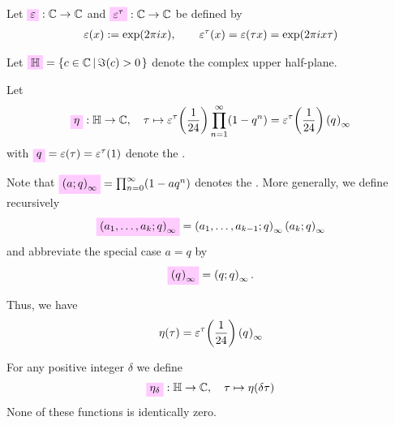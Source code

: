 \documentclass{article}
\begin{document}
\begin{Definition}\label{def:epsilon}
  Let $\defineNotation[epsilon]{\unityPowerSymbol}: \setC \to \setC$
  and $\defineNotation[epsilon-tau]{\unityPowerSymbol^\tau}: \setC \to \setC$
  be defined by
  \begin{gather*}
    \varepsilon\!\left(x\right) := \exp(2\pi i x),
    \qquad
    \varepsilon^\tau\!\left(x\right)=\varepsilon\!\left(\tau x\right) = \exp(2\pi i x \tau)
  \end{gather*}
\end{Definition}

Let $\defineNotation[H]{\setH}=\SetDef{c\in \setC}{\Im(c)>0}$ denote
the complex upper half-plane.

Let
\begin{gather}\label{eq:eta-expansion}
  \defineNotation[eta]{\eta}: \setH \to \setC, \quad
  \tau \mapsto \unityPowerTau{\frac{1}{24}} \prod_{n=1}^{\infty}(1-q^n)
  =
  \unityPowerTau{\frac{1}{24}} \eulerFunction{}
\end{gather}
with $\defineNotation[q]{q} = \unityPower{\tau} = \unityPowerTau{1}$
denote the .

Note that
$\defineNotation[a-q]{\qPochhammer{a}{q}}=\prod_{n=0}^{\infty}(1-aq^n)$
denotes the .
More generally, we define recursively
\begin{gather}
  \defineNotation[a-k-q]{\qPochhammer{a_1,\ldots,a_k}{q}}
  =
  \qPochhammer{a_1,\ldots,a_{k-1}}{q} \qPochhammer{a_k}{q}
\end{gather}
and abbreviate the special case $a=q$ by
\begin{gather}
  \defineNotation[q-EulerFunction]{\eulerFunction{}}
  = \qPochhammer{q}{q}.
\end{gather}


Thus, we have
\begin{gather*}
  \eta(\tau) = \varepsilon^\tau\!\left(\frac{1}{24}\right) \left({q}^{}\right)_{\infty}
\end{gather*}

For any positive integer $\delta$ we define
\begin{gather}
  \defineNotation[eta-delta]{\eta_\delta}: \setH \to \setC,\quad \tau
  \mapsto \eta(\delta\tau)
  \label{eq:eta_delta(tau)}
\end{gather}
None of these functions is identically zero.
\end{document}
